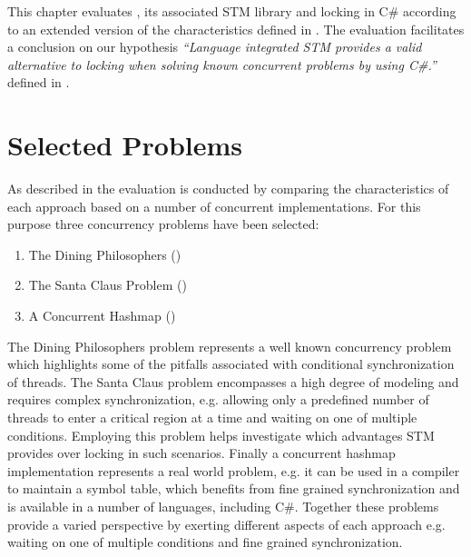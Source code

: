 \makeatletter {}\makeatother
{}
This chapter evaluates \stmname, its associated \ac{STM} library and locking in C\# according to an extended version of the characteristics defined in \cite[p. 15-21]{dpt907e14trending}. The evaluation facilitates a conclusion on our hypothesis \textit{``Language integrated \ac{STM} provides a valid alternative to locking when solving known concurrent problems by using C\#.''} defined in .
\label{chap:evaluation}
\section{Selected Problems}
As described in  the evaluation is conducted by comparing the characteristics of each approach based on a number of concurrent implementations. For this purpose three concurrency problems have been selected:
\begin{enumerate}
\item The Dining Philosophers ()
\item The Santa Claus Problem ()
\item A Concurrent Hashmap ()
\end{enumerate}
The Dining Philosophers problem represents a well known concurrency problem which highlights some of the pitfalls associated with conditional synchronization of threads. The Santa Claus problem encompasses a high degree of modeling and requires complex synchronization, e.g. allowing only a predefined number of threads to enter a critical region at a time and waiting on one of multiple conditions. Employing this problem helps investigate which advantages \ac{STM} provides over locking in such scenarios. Finally a concurrent hashmap implementation represents a real world problem, e.g. it can be used in a compiler to maintain a symbol table, which benefits from fine grained synchronization and is available in a number of languages, including C\#. Together these problems provide a varied perspective by exerting different aspects of each approach e.g. waiting on one of multiple conditions and fine grained synchronization.

